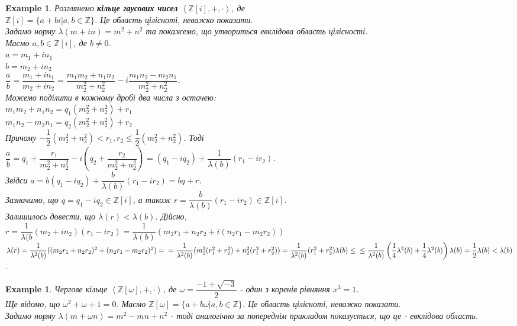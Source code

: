 \documentclass[a4paper, 14pt]{extarticle}
\theoremstyle{theoremdd}
\theoremstyle{theoremdd}
\theoremstyle{theoremdd}
\theoremstyle{theoremdd}
\newtheorem{example}[theorem]{Example}
\theoremstyle{theoremdd}
\theoremstyle{theoremdd}
\theoremstyle{theoremdd}
\theoremstyle{theoremdd}
\begin{document}
\begin{example}
Розглянемо \textbf{кільце гаусових чисел} $\left< \mathbb{Z}[i], +, \cdot \right>$, де\\
$\mathbb{Z}[i] = \{ a+bi | a,b \in \mathbb{Z} \}$. Це область цілісноті, неважко показати.\\
Задамо норму $\lambda(m+in) = m^2 + n^2$ та покажемо, що утвориться евклідова область цілісності.\\
Маємо $a,b \in \mathbb{Z}[i]$, де $b \neq 0$.\\
$a = m_1 + in_1$\\
$b = m_2 + in_2$\\
$\dfrac{a}{b} = \dfrac{m_1+in_1}{m_2+in_2} = \dfrac{m_1m_2+n_1n_2}{m_2^2+n_2^2} - i \dfrac{m_1n_2 - m_2n_1}{m_2^2+n_2^2}$.\\
Можемо поділити в кожному дробі два числа з остачею:\\
$m_1m_2 + n_1n_2 = q_1(m_2^2+n_2^2) + r_1$\\
$m_1n_2 - m_2n_1 = q_2(m_2^2+n_2^2) + r_2$\\
Причому $-\dfrac{1}{2} (m_2^2+n_2^2) < r_1,r_2 \leq \dfrac{1}{2}(m_2^2+n_2^2)$. Тоді\\
$\dfrac{a}{b} = q_1 + \dfrac{r_1}{m_2^2 + n_2^2} - i \left( q_2 + \dfrac{r_2}{m_2^2+n_2^2} \right) = (q_1-iq_2) + \dfrac{1}{\lambda(b)}(r_1-ir_2)$.\\
Звідси $a = b(q_1-iq_2) + \dfrac{b}{\lambda(b)}(r_1-ir_2) = bq + r$.\\
Зазначимо, що $q = q_1-iq_2 \in \mathbb{Z}[i]$, а також $r = \dfrac{b}{\lambda(b)}(r_1-ir_2) \in \mathbb{Z}[i]$.\\
Залишилось довести, що $\lambda(r) < \lambda(b)$. Дійсно,\\
$r = \dfrac{1}{\lambda(b}(m_2+in_2)(r_1-ir_2) = \dfrac{1}{\lambda(b)}(m_2r_1+n_2r_2 + i(n_2r_1 - m_2r_2))$\\
$\lambda(r) = \dfrac{1}{\lambda^2(b)} ((m_2r_1+n_2r_2)^2 + (n_2r_1-m_2r_2)^2) = \\
= \dfrac{1}{\lambda^2(b)} (m_2^2(r_1^2+r_2^2) + n_2^2(r_1^2+r_2^2)) = \dfrac{1}{\lambda^2(b)} (r_1^2+r_2^2) \lambda(b) \leq \\ \leq \dfrac{1}{\lambda^2(b)} \left( \dfrac{1}{4}\lambda^2(b) + \dfrac{1}{4} \lambda^2(b) \right) \lambda(b) = \dfrac{1}{2} \lambda(b) < \lambda(b)$.
\end{example}

\begin{example}
Чергове кільце $\left< \mathbb{Z}[\omega], +, \cdot \right>$, де $\omega = \dfrac{-1+ \sqrt{-3}}{2}$ - один з коренів рівняння $x^3=1$.\\
Ще відомо, що $\omega^2 + \omega + 1 = 0$. Маємо $\mathbb{Z}[\omega] = \{ a+b \omega | a,b \in \mathbb{Z} \}$. Це область цілісноті, неважко показати.\\
Задамо норму $\lambda(m+ \omega n) = m^2 - mn + n^2$ - тоді аналогічно за попереднім прикладом показується, що це - евклідова область.
\end{example}
\end{document}
